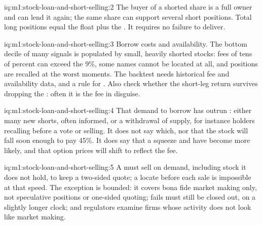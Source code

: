 \begin{solution}{iq:m1:stock-loan-and-short-selling:2}
The buyer of a shorted share is a full owner and can lend it again; the same
share can support several short positions. Total long positions equal the
float plus the . It requires no failure to deliver.
\end{solution}

\begin{solution}{iq:m1:stock-loan-and-short-selling:3}
Borrow costs and availability. The bottom decile of many signals is
populated by small, heavily shorted stocks: fees of tens of percent can
exceed the 9\%, some names cannot be located at all, and positions are
recalled at the worst moments. The backtest needs historical fee and
availability data, and a rule for . Also check whether the short-leg
return survives dropping the : often it is the fee in disguise.
\end{solution}

\begin{solution}{iq:m1:stock-loan-and-short-selling:4}
That demand to borrow has outrun : either many new shorts,
often informed, or a
withdrawal of supply, for instance holders recalling before a vote or
selling. It does not say which, nor that the stock will fall soon enough to
pay 45\%. It does say that a squeeze and  have become more likely,
and that option prices will shift to reflect the fee.
\end{solution}

\begin{solution}{iq:m1:stock-loan-and-short-selling:5}
A  must sell on demand, including stock it does not hold, to
keep a two-sided quote; a locate before each sale is impossible at that
speed. The exception is bounded: it covers bona fide market making only, not
speculative positions or one-sided quoting; fails must still be closed out,
on a slightly longer clock; and regulators examine firms whose activity does
not look like market making.
\end{solution}

